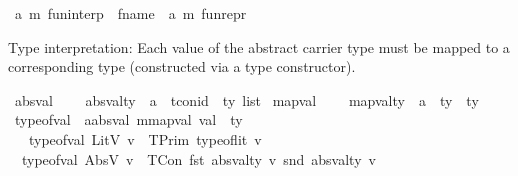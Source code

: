 \begin{isabellebody}
\isamarkupfalse%
\ {\isacharparenleft}{\kern0pt}{\isacharprime}{\kern0pt}a{\isacharcomma}{\kern0pt}\ {\isacharprime}{\kern0pt}m{\isacharparenright}{\kern0pt}\ fun{\isacharunderscore}{\kern0pt}interp\ {\isacharequal}{\kern0pt}\ {\isachardoublequoteopen}fname\ {\isasymrightharpoonup}\ {\isacharparenleft}{\kern0pt}{\isacharprime}{\kern0pt}a{\isacharcomma}{\kern0pt}\ {\isacharprime}{\kern0pt}m{\isacharparenright}{\kern0pt}\ fun{\isacharunderscore}{\kern0pt}repr{\isachardoublequoteclose}%
\begin{isamarkuptext}%
Type interpretation:
Each value of the abstract carrier type must be mapped to a corresponding type (constructed via a
type constructor).%
\end{isamarkuptext}\isamarkuptrue%
\isamarkupfalse%
\ absval\ {\isacharequal}{\kern0pt}\isanewline
\ \ \ absval{\isacharunderscore}{\kern0pt}ty\ {\isacharcolon}{\kern0pt}{\isacharcolon}{\kern0pt}\ {\isachardoublequoteopen}{\isacharprime}{\kern0pt}a\ {\isasymRightarrow}\ {\isacharparenleft}{\kern0pt}tcon{\isacharunderscore}{\kern0pt}id\ {\isasymtimes}\ ty\ list{\isacharparenright}{\kern0pt}{\isachardoublequoteclose}\isanewline
\isanewline
{}\isamarkupfalse%
\ mapval\ {\isacharequal}{\kern0pt}\isanewline
\ \ \ mapval{\isacharunderscore}{\kern0pt}ty\ {\isacharcolon}{\kern0pt}{\isacharcolon}{\kern0pt}\ {\isachardoublequoteopen}{\isacharprime}{\kern0pt}a\ {\isasymRightarrow}\ {\isacharparenleft}{\kern0pt}ty\ {\isasymtimes}\ ty{\isacharparenright}{\kern0pt}{\isachardoublequoteclose}\isanewline
\isanewline
{}\isamarkupfalse%
\ type{\isacharunderscore}{\kern0pt}of{\isacharunderscore}{\kern0pt}val\ {\isacharcolon}{\kern0pt}{\isacharcolon}{\kern0pt}\ {\isachardoublequoteopen}{\isacharparenleft}{\kern0pt}{\isacharprime}{\kern0pt}a{\isacharcolon}{\kern0pt}{\isacharcolon}{\kern0pt}absval{\isacharcomma}{\kern0pt}\ {\isacharprime}{\kern0pt}m{\isacharcolon}{\kern0pt}{\isacharcolon}{\kern0pt}mapval{\isacharparenright}{\kern0pt}\ val\ {\isasymRightarrow}\ ty{\isachardoublequoteclose}\isanewline
\ \ \isanewline
\ \ \ {\isachardoublequoteopen}type{\isacharunderscore}{\kern0pt}of{\isacharunderscore}{\kern0pt}val\ {\isacharparenleft}{\kern0pt}LitV\ v{\isacharparenright}{\kern0pt}\ {\isacharequal}{\kern0pt}\ TPrim\ {\isacharparenleft}{\kern0pt}type{\isacharunderscore}{\kern0pt}of{\isacharunderscore}{\kern0pt}lit\ v{\isacharparenright}{\kern0pt}{\isachardoublequoteclose}\isanewline
\ {\isacharbar}{\kern0pt}\ {\isachardoublequoteopen}type{\isacharunderscore}{\kern0pt}of{\isacharunderscore}{\kern0pt}val\ {\isacharparenleft}{\kern0pt}AbsV\ v{\isacharparenright}{\kern0pt}\ {\isacharequal}{\kern0pt}\ TCon\ {\isacharparenleft}{\kern0pt}fst\ {\isacharparenleft}{\kern0pt}absval{\isacharunderscore}{\kern0pt}ty\ v{\isacharparenright}{\kern0pt}{\isacharparenright}{\kern0pt}\ {\isacharparenleft}{\kern0pt}snd\ {\isacharparenleft}{\kern0pt}absval{\isacharunderscore}{\kern0pt}ty\ v{\isacharparenright}{\kern0pt}{\isacharparenright}{\kern0pt}{\isachardoublequoteclose}\isanewline

\end{isabellebody}
